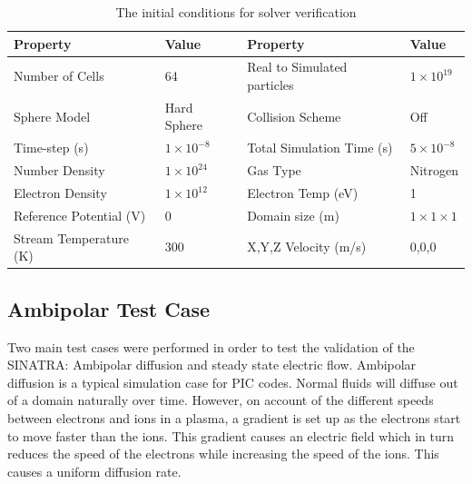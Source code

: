 \begin{table}
\caption{The initial conditions for solver verification}
\vspace{0.3cm}
\begin{tabular}{|ll|ll|}
\hline
Property               & Value                & Property                    & Value                \\ \hline
Number of Cells        & 64                 & Real to Simulated particles & \(1 \times 10^{19}\)    \\
Sphere Model           & Hard Sphere          & Collision Scheme            & Off                  \\
Time-step (s)          & \(1 \times 10^{-8}\) & Total Simulation  Time (s)  & \(5 \times 10^{-8}\) \\
Number Density         & \(1 \times 10^{24}\) & Gas Type                    & Nitrogen                \\
Electron Density       & \(1 \times 10^{12}\) & Electron Temp (eV)          & 1                  \\
Reference Potential (V)       & 0 & Domain size (m)          & \(1\times 1 \times 1\)                  \\
Stream Temperature (K) & 300                 & X,Y,Z Velocity (m/s)              & 0,0,0 \\ \hline
\end{tabular}
\label{tab:gausstable}

\end{table}

\subsection{Ambipolar Test Case}

Two main test cases were performed in order to test the validation of the SINATRA: Ambipolar diffusion and steady state electric flow. Ambipolar diffusion is a typical simulation case for PIC codes. Normal fluids will diffuse out of a domain naturally over time. However, on account of the different speeds between electrons and ions in a plasma, a gradient is set up as the electrons start to move faster than the ions. This gradient causes an electric field which in turn reduces the speed of the electrons while increasing the speed of the ions. This causes a uniform diffusion rate.  \par


